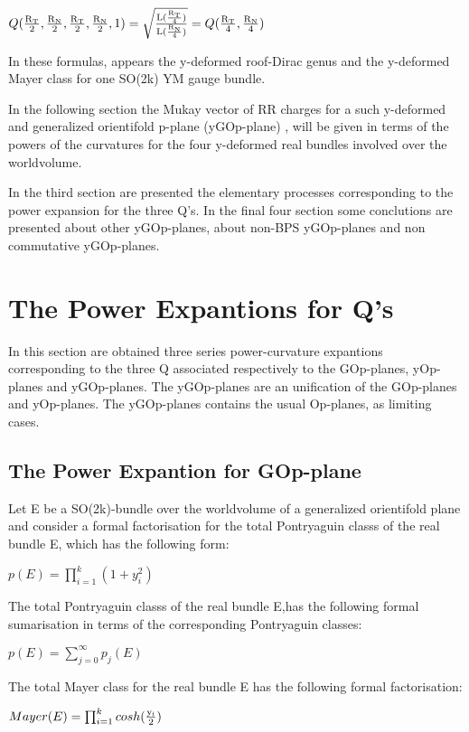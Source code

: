 \documentclass[a4paper,a4paper]{article}
\begin{document}
\begin{center}
{  $ Q(\frac{\rm R_T}{\rm 2},\frac{\rm R_N}{\rm 2},\frac{\rm R_T}{\rm 2},\frac{\rm R_N}{\rm 2},1) =\sqrt{\frac{\rm L(\frac{\rm R_T}{\rm 4})}{\rm L(\frac{\rm R_N}{\rm 4})}}=Q(\frac{\rm R_T}{\rm 4},\frac{\rm R_N}{\rm 4}) $ }
\end{center}

In these formulas, appears the y-deformed roof-Dirac genus and  the y-deformed  Mayer class for one SO(2k) YM gauge bundle.

    
In the following section the Mukay vector of RR charges for a such y-deformed and generalized orientifold p-plane (yGOp-plane) , will be given in terms of the powers of the curvatures for the four y-deformed real bundles involved over the worldvolume.


 




 In the third section are presented the elementary processes corresponding to the power expansion for the three Q's. In the final four section some conclutions are presented about other yGOp-planes, about non-BPS yGOp-planes and non commutative yGOp-planes.

\section{The Power Expantions for Q's}
In this section are obtained three series power-curvature expantions corresponding to the three Q associated respectively to the GOp-planes, yOp-planes and yGOp-planes.  The yGOp-planes are an unification of the GOp-planes and yOp-planes. The yGOp-planes contains the usual Op-planes, as
limiting cases.
\subsection{The Power Expantion for GOp-plane }

Let E be a SO(2k)-bundle over the worldvolume of a generalized orientifold plane and consider a formal factorisation for the total Pontryaguin classs of the real bundle E, which has the following form:

\begin{center}
{  $ p(E) = \prod_{i=1}^k(1+y_i^2)$ }
\end{center}
The total Pontryaguin classs of the real bundle E,has the following formal sumarisation in terms of the corresponding Pontryaguin classes: 
\begin{center}
{  $ p(E) = \sum_{j=0}^{\infty}p_j(E) $ }
\end{center}
The total Mayer class for the real bundle E has the following formal factorisation:
\begin{center}
{  $ Mayer(E) = \prod_{i=1}^kcosh(\frac{\rm y_i}{\rm 2})$ }
\end{center}
\end{document}
